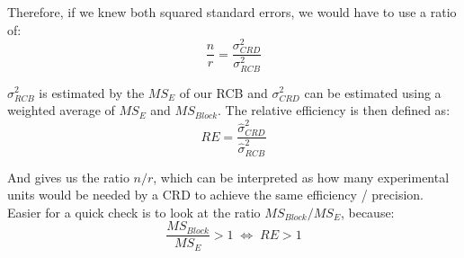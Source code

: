 Therefore, if we knew both squared standard errors, we would have to use a ratio of:
$$\frac{n}{r} = \frac{\sigma_{CRD}^2}{\sigma_{RCB}^2}$$

$\sigma_{RCB}^2$ is estimated by the $MS_E$ of our RCB and $\sigma_{CRD}^2$ can be estimated using a weighted average of $MS_E$ and $MS_{Block}$. The relative efficiency is then defined as:
$$RE = \frac{\hat \sigma_{CRD}^2}{\hat \sigma_{RCB}^2}$$

And gives us the ratio $n / r$, which can be interpreted as how many experimental units would be needed by a CRD to achieve the same efficiency / precision. Easier for a quick check is to look at the ratio $MS_{Block} / MS_E$, because:
$$\frac{MS_{Block}}{MS_E} > 1 \; \Leftrightarrow \; RE > 1$$
